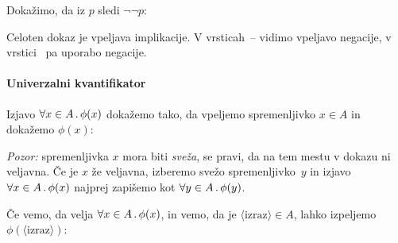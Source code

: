 \begin{zgled}
  \label{zgled:p-dvojna-negacija}
  Dokažimo, da iz $p$ sledi $\neg\neg p$:
  \begin{boxDisplay}
  \begin{boxedProof}[numbered]
    \begin{boxFrame}
    \end{boxFrame}
  \end{boxedProof}
  \end{boxDisplay}
  Celoten dokaz je vpeljava implikacije.
  V vrsticah~-- vidimo vpeljavo negacije,
  v vrstici~ pa uporabo negacije.
\end{zgled}



\paragraph*{Univerzalni kvantifikator}
\label{sec:univerzalni-kvantifikator-pravila}

Izjavo $\forall x \in A \,.\, \phi(x)$ dokažemo tako, da vpeljemo spremenljivko $x \in A$ in dokažemo $\phi(x)$:
%
\begin{boxDisplay}
  \begin{boxedProof}
    \begin{boxFrame}
    \end{boxFrame}
  \end{boxedProof}
\end{boxDisplay}
%
\emph{Pozor:} spremenljivka $x$ mora biti \emph{sveža}, se pravi, da na tem mestu v dokazu ni veljavna. Če je $x$ že veljavna, izberemo svežo spremenljivko~$y$ in izjavo $\forall x \in A \,.\, \phi(x)$ najprej zapišemo kot $\forall y \in A \,.\, \phi(y)$.

Če vemo, da velja $\forall x \in A \,.\, \phi(x)$, in vemo, da je $\langle\text{izraz}\rangle \in A$, lahko izpeljemo $\phi(\langle\text{izraz}\rangle)$:
%
\begin{boxDisplay}
  \begin{boxedProof}[reserved]
    \begin{boxFrame}
      \boxGap
      \boxGap
    \end{boxFrame}
  \end{boxedProof}
\end{boxDisplay}

